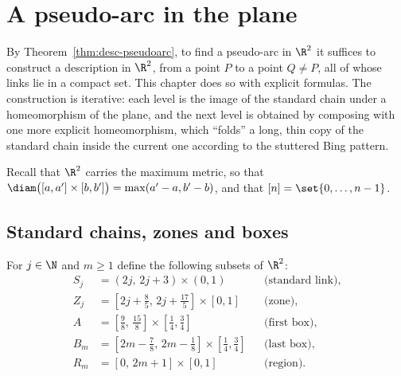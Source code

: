 \chapter{A pseudo-arc in the plane}\label{ch:plane}

By Theorem~\ref{thm:desc-pseudoarc}, to find a pseudo-arc in $\R^2$ it suffices to construct a
description in $\R^2$, from a point $P$ to a point $Q\neq P$, all of whose links lie in a compact
set. This chapter does so with explicit formulas. The construction is iterative: each level is
the image of the standard chain under a homeomorphism of the plane, and the next level is
obtained by composing with one more explicit homeomorphism, which ``folds'' a long, thin copy
of the standard chain inside the current one according to the stuttered Bing pattern.

Recall that $\R^2$ carries the maximum metric, so that $\diam\big([a,a']\times[b,b']\big)=
\max(a'-a,b'-b)$, and that $[n]=\set{0,\dots,n-1}$.

\section{Standard chains, zones and boxes}\label{sec:std}

\begin{definition}\label{def:std-sets}
For $j\in\N$ and $m\ge1$ define the following subsets of $\R^2$:
\begin{align*}
S_j&=(2j,\,2j+3)\times(0,1) &&\text{(standard link)},\\
Z_j&=[2j+\tfrac85,\,2j+\tfrac{17}5]\times[0,1] &&\text{(zone)},\\
A&=[\tfrac98,\,\tfrac{15}8]\times[\tfrac14,\tfrac34] &&\text{(first box)},\\
B_m&=[2m-\tfrac78,\,2m-\tfrac18]\times[\tfrac14,\tfrac34] &&\text{(last box)},\\
R_m&=[0,\,2m+1]\times[0,1] &&\text{(region)}.
\end{align*}
\end{definition}


